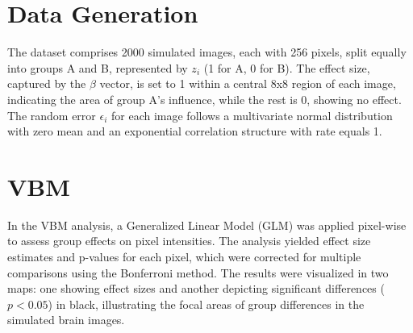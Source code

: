 \documentclass[12pt]{article}
\begin{document}
\section*{Data Generation}

The dataset comprises 2000 simulated images, each with 256 pixels, split equally into groups A and B, represented by \(z_i\) (1 for A, 0 for B). The effect size, captured by the \(\beta\) vector, is set to 1 within a central 8x8 region of each image, indicating the area of group A's influence, while the rest is 0, showing no effect. The random error \(\epsilon_i\) for each image follows a multivariate normal distribution with zero mean and an exponential correlation structure with rate equals 1.

\section*{VBM}

In the VBM analysis, a Generalized Linear Model (GLM) was applied pixel-wise to assess group effects on pixel intensities. The analysis yielded effect size estimates and p-values for each pixel, which were corrected for multiple comparisons using the Bonferroni method. The results were visualized in two maps: one showing effect sizes and another depicting significant differences (\(p < 0.05\)) in black, illustrating the focal areas of group differences in the simulated brain images.
\end{document}
